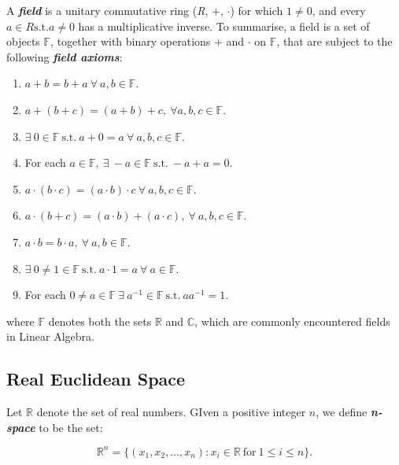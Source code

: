 \documentclass{article}
\begin{document}
\begin{definition}
    A \textbf{\textit{field}} is a unitary commutative ring (\textit{R}, $+$, $\cdot$) for which $1 \neq 0$, and every $a \in R \text{s.t.} a \neq 0$ has a multiplicative inverse. 
    To summarise, a field is a set of objects $\mathbb{F}$, together with binary operations $+$ and $\cdot$ on $\mathbb{F}$, that are subject to the following \textbf{\textit{field axioms}}: 
    \begin{enumerate}
        \item $a + b = b + a \ \forall \ a,b \in \mathbb{F}$.
        \item $a + (b + c) = (a + b) + c, \ \forall a, b, c \in \mathbb{F}$.
        \item $\exists \ 0 \in \mathbb{F} \ \text{s.t.} \ a + 0 = a \ \forall \ a,b,c \in \mathbb{F}$.
        \item For each $a \in \mathbb{F}, \ \exists \ -a \in \mathbb{F} \ \text{s.t.} \ -a + a = 0$. 
        \item $a \cdot (b \cdot c) = (a \cdot b) \cdot c \ \forall \ a, b, c \in \mathbb{F}$. 
        \item $a \cdot (b + c) = (a \cdot b) + (a \cdot c), \ \forall \ a, b, c \in \mathbb{F}$.
        \item $a \cdot b = b \cdot a, \ \forall \ a, b \in \mathbb{F}$.
        \item $\exists \ 0 \neq 1 \in \mathbb{F} \ \text{s.t.} \ a \cdot 1 = a \ \forall \ a \in \mathbb{F}$.
        \item For each $0 \neq a \in \mathbb{F} \ \exists \ a^{-1} \in \mathbb{F} \ \text{s.t.} \ a a^{-1} = 1$. 
    \end{enumerate}
\end{definition}

\noindent where $\mathbb{F}$ denotes both the sets $\mathbb{R}$ and $\mathbb{C}$, which are commonly encountered fields in Linear Algebra.

\subsection{Real Euclidean Space}
Let $\mathbb{R}$ denote the set of real numbers. GIven a positive integer $n$, we define \textbf{\textit{n-space}} to be the set: 

\begin{equation}
    \mathbb{R}^n = \{(x_{1}, x_{2}, \dots , x_n): x_i \in \mathbb{R} \ \text{for} \ 1 \leq i \leq n\}.
\end{equation}
\end{document}
